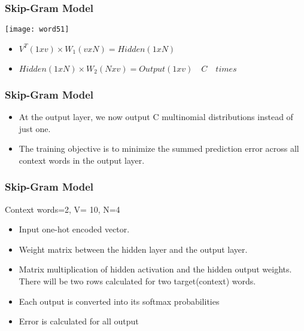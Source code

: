 \begin{frame}[fragile]\frametitle{Skip-Gram Model}

\begin{center}
\texttt{[image: word51]}
\end{center}
\begin{itemize}
\item $V^T(1xv) \times W_1(vxN) = Hidden(1xN)$
\item $Hidden(1xN)  \times W_2(Nxv) = Output(1xv)  \quad  C \quad times$
\end{itemize}
\end{frame}



\begin{frame}[fragile]\frametitle{Skip-Gram Model}
\begin{itemize}
\item At the output layer, we now output C multinomial distributions instead of just one. 
\item The training objective is to minimize the summed prediction error across all context words in the output layer. 
\end{itemize}
\end{frame}

\begin{frame}[fragile]\frametitle{Skip-Gram Model}
Context words=2, V= 10, N=4
\begin{itemize}
\item Input one-hot encoded vector.
\item  Weight matrix between the hidden layer and the output layer.
\item Matrix multiplication of hidden activation and the hidden output weights. There will be two rows calculated for two target(context) words.
\item Each output is converted into its softmax probabilities
\item Error is calculated for all output
\end{itemize}
\end{frame}

